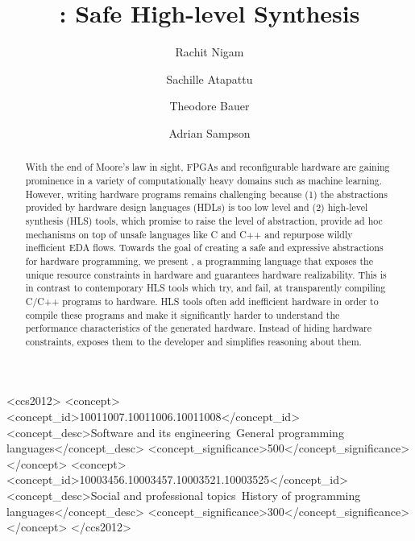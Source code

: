 \documentclass[acmsmall,review,anonymous]{acmart}\settopmatter{printfolios=true,printccs=false,printacmref=false}
\begin{document}
\title[]{\sys{}: Safe High-level Synthesis}

\author{Rachit Nigam}
\author{Sachille Atapattu}
\author{Theodore Bauer}
\author{Adrian Sampson}


\begin{abstract}
With the end of Moore's law in sight, FPGAs and reconfigurable hardware are
gaining prominence in a variety of computationally heavy domains such as
machine learning. However, writing hardware programs remains challenging
because (1) the abstractions provided by hardware design languages (HDLs) is
too low level and (2) high-level synthesis (HLS) tools, which promise to
raise the level of abstraction, provide ad hoc mechanisms on top of unsafe
languages like C and C++ and repurpose wildly inefficient EDA flows. Towards
the goal of creating a safe and expressive abstractions for hardware
programming, we present \sys{}, a programming language that exposes the
unique resource constraints in hardware and guarantees hardware
realizability. This is in contrast to contemporary HLS tools which try, and
fail, at transparently compiling C/C++ programs to hardware. HLS tools often
add inefficient hardware in order to compile these programs and make it
significantly harder to understand the performance characteristics of the
generated hardware. Instead of hiding hardware constraints, \sys{} exposes
them to the developer and simplifies reasoning about them.
\end{abstract}

\begin{CCSXML}
<ccs2012>
<concept>
<concept_id>10011007.10011006.10011008</concept_id>
<concept_desc>Software and its engineering~General programming languages</concept_desc>
<concept_significance>500</concept_significance>
</concept>
<concept>
<concept_id>10003456.10003457.10003521.10003525</concept_id>
<concept_desc>Social and professional topics~History of programming languages</concept_desc>
<concept_significance>300</concept_significance>
</concept>
</ccs2012>
\end{CCSXML}
\end{document}
